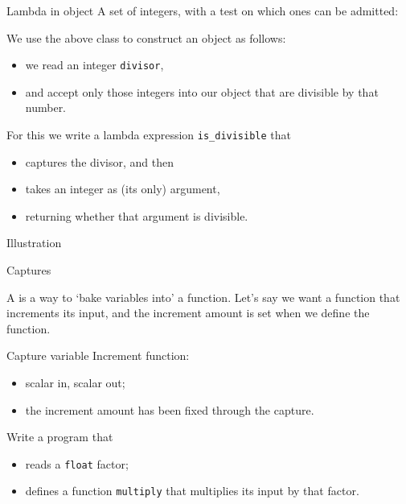 \begin{block}{Lambda in object}
  \label{sl:lambda-class}
  A set of integers, with a test on which ones can be admitted:
  \begin{multicols}{2}
  \end{multicols}
\end{block}

We use the above class to construct an object as follows:
\begin{itemize}
\item we read an integer \lstinline{divisor},
\item and accept only those integers into our object
  that are divisible by that number.
\end{itemize}
For this we write a lambda expression \lstinline{is_divisible} that 
\begin{itemize}
\item captures the divisor, and then
\item takes an integer as (its only) argument,
\item returning whether that argument is divisible.
\end{itemize}

\begin{block}{Illustration}
  \label{sl:lambda-classed}
\end{block}

 {Captures}

A  is a way to `bake variables into' a function.
Let's say we want a function that increments its input,
and the increment amount is set when we define the function.

\begin{block}{Capture variable}
  \label{sl:capture-increment}
  Increment function:
  \begin{itemize}
  \item scalar in, scalar out;
  \item the increment amount has been fixed through the capture.
  \end{itemize}
\end{block}

\begin{exercise}
  \label{ex:capture-factor}
  Write a program that 
  \begin{itemize}
  \item reads a \lstinline{float} factor;
  \item defines a function \lstinline{multiply} that
    multiplies its input by that factor.
  \end{itemize}
\end{exercise}

